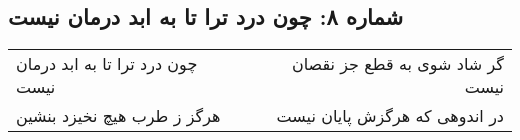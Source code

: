 \begin{center}
\section*{شماره ۸: چون درد ترا تا به ابد درمان نیست}
\label{sec:008}
\begin{longtable}{l p{0.5cm} r}
چون درد ترا تا به ابد درمان نیست
&&
گر شاد شوی به قطع جز نقصان نیست
\\
هرگز ز طرب هیچ نخیزد بنشین
&&
در اندوهی که هرگزش پایان نیست
\\
\end{longtable}
\end{center}

